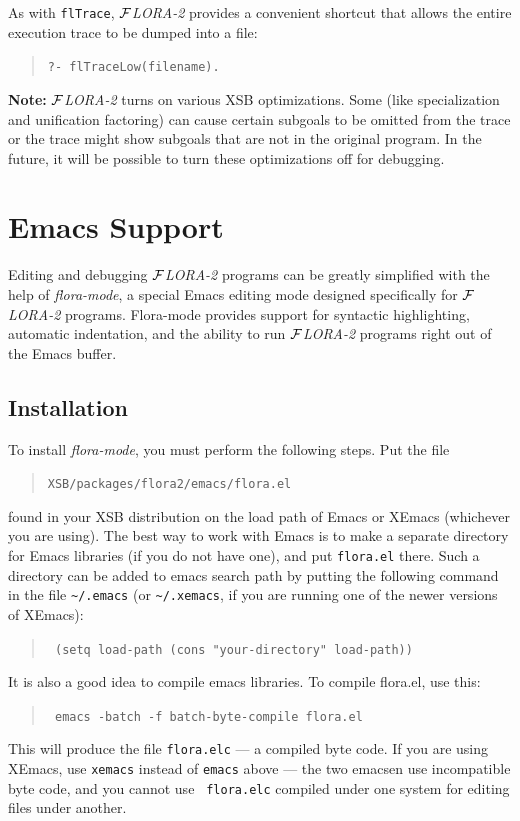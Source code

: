 \documentclass[11pt]{article}
\newcommand{\FLORA}{{\mbox{${\cal F}${\small\it LORA}\rm\emph{-2}}}\xspace}
\begin{document}
As with {\tt flTrace}, \FLORA provides a convenient shortcut that allows
the entire execution trace to be dumped into a file:
\begin{quote}
 \tt ?- flTraceLow(filename).  
\end{quote}

{\bf Note:} \FLORA turns on various XSB optimizations. Some (like
specialization and unification factoring) can cause certain subgoals to
be omitted from the trace or the trace might show subgoals that
are not in the original program. In the future, it will be possible to turn
these optimizations off for debugging.


\section{Emacs Support}

Editing and debugging \FLORA programs can be greatly simplified with the
help of \emph{flora-mode}, a special Emacs editing mode designed
specifically for \FLORA programs. Flora-mode provides support for syntactic
highlighting, automatic indentation, and the ability to run \FLORA programs
right out of the Emacs buffer.


\subsection{Installation}


To install \emph{flora-mode}, you must perform the following steps. Put the
file
\begin{quote}
  {\tt XSB/packages/flora2/emacs/flora.el} 
\end{quote}
found in your XSB distribution on the load path of Emacs or XEmacs
(whichever you are using). The best way to work with Emacs is to make a
separate directory for Emacs libraries (if you do not have one), and put
{\tt flora.el} there. Such a directory can be added to emacs search path by
putting the following command in the file \verb|~/.emacs| (or
\verb|~/.xemacs|, if you are running one of the newer versions of XEmacs):
\begin{quote}
  \tt
   (setq load-path (cons "your-directory" load-path)) 
\end{quote}
It is also a good idea to compile emacs libraries. To compile flora.el,
use this:
\begin{quote}
  \tt
   emacs -batch -f batch-byte-compile flora.el 
\end{quote}
This will produce the file {\tt flora.elc} --- a compiled byte code.
If you are using XEmacs, use {\tt xemacs} instead of {\tt emacs} above ---
the two emacsen use incompatible byte code, and you cannot use {\tt
  flora.elc} compiled under one system for editing files under another.
\end{document}
